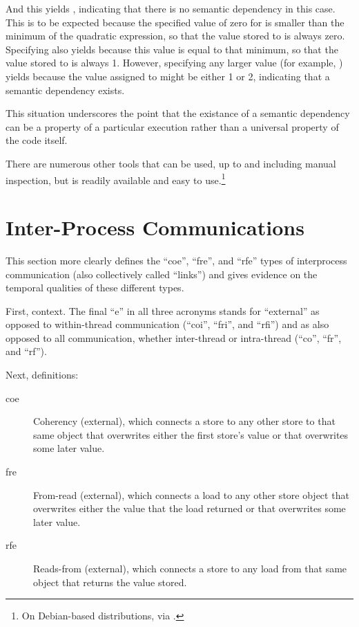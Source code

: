 \documentclass[10]{article}
\begin{document}
And this yields , indicating that there
is no semantic dependency in this case.
This is to be expected because the specified value of zero for 
is smaller than the minimum of the quadratic expression, so that the
value stored to  is always zero.
Specifying  also yields 
because this value is equal to that minimum, so that the value stored to
 is always 1.
However, specifying any larger value (for example, )
yields  because the value assigned to 
might be either 1 or 2, indicating that a semantic dependency exists.

This situation underscores the point that the existance of a semantic
dependency can be a property of a particular execution rather than a
universal property of the code itself.

There are numerous other tools that can be used, up to and including
manual inspection, but  is readily available and easy to
use.\footnote{
	On Debian-based distributions, via .}

\clearpage

\section{Inter-Process Communications}
\label{app:Inter-Process Communications}

This section more clearly defines the ``coe'', ``fre'', and ``rfe''
types of interprocess communication (also collectively called ``links'')
and gives evidence on the temporal qualities of these different types.

First, context.
The final ``e'' in all three acronyms stands for ``external'' as opposed
to within-thread communication (``coi'', ``fri'', and ``rfi'') and as
also opposed to all communication, whether inter-thread or intra-thread
(``co'', ``fr'', and ``rf'').

Next, definitions:

\begin{description}
\item[coe]
	Coherency (external), which connects a store to any other store
	to that same object that overwrites either the first store's
	value or that overwrites some later value.
\item[fre]
	From-read (external), which connects a load to any other store
	object that overwrites either the value that the load returned
	or that overwrites some later value.
\item[rfe]
	Reads-from (external), which connects a store to any load from
	that same object that returns the value stored.
\end{description}
\end{document}
